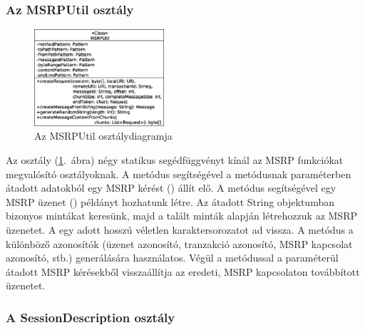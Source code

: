 \subsubsection*{Az MSRPUtil osztály}
\label{sec:msrp_util}

\begin{figure}
  \vspace{-15pt}
  \begin{center}
    \includegraphics[width=0.43\textwidth]{img/class_diagrams/MSRPUtil.eps}
  \end{center}
  \vspace{-15pt}
  \captionsetup{font=scriptsize}
  \caption{Az MSRPUtil osztálydiagramja}
   \label{fig:class_util}
  \vspace{-10pt}
\end{figure}
Az  osztály (\ref{fig:class_util}.~ábra) négy statikus segédfüggvényt kínál az MSRP funkciókat megvalósító osztályoknak. A  metódus segítségével a metódusnak paraméterben átadott adatokból egy MSRP kérést () állít elő. A  metódus segítségével egy MSRP üzenet () példányt hozhatunk létre. Az átadott String objektumban bizonyos mintákat keresünk, majd a talált minták alapján létrehozzuk az MSRP üzenetet. A  egy adott hosszú véletlen karaktersorozatot ad vissza. A metódus a különböző azonosítók (üzenet azonosító, tranzakció azonosító, MSRP kapcsolat azonosító, stb.) generálására használatos. Végül a  metódussal a paraméterül átadott MSRP kérésekből visszaállítja az eredeti, MSRP kapcsolaton továbbított üzenetet.

\subsubsection*{A SessionDescription osztály}
\label{sec:msrp_sdp}

